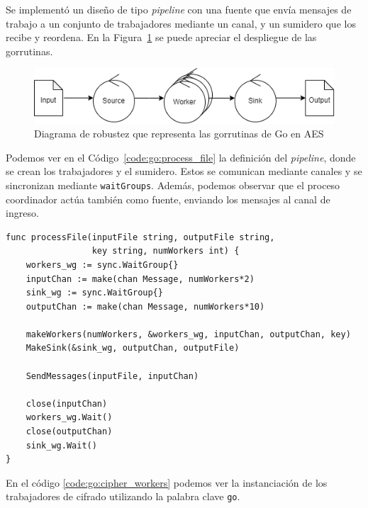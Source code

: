 \documentclass[11pt]{article}
\newcommand{\english}[1]{\textit{#1}}
\begin{document}
Se implementó un diseño de tipo \english{pipeline} con una fuente que envía mensajes de trabajo a un conjunto de trabajadores mediante un canal, y un sumidero que los recibe y reordena. En la Figura~\ref{fig:go:robustness} se puede apreciar el despliegue de las gorrutinas.

\begin{figure}[h]
    \centering
    \includegraphics[scale=0.7]{resources/aes/go_robustness.png}
    \caption{Diagrama de robustez que representa las gorrutinas de Go en AES}
    \label{fig:go:robustness}
\end{figure}

Podemos ver en el Código~\ref{code:go:process_file} la definición del \english{pipeline}, donde se crean los trabajadores y el sumidero. Estos se comunican mediante canales y se sincronizan mediante \lstinline{waitGroups}. Además, podemos observar que el proceso coordinador actúa también como fuente, enviando los mensajes al canal de ingreso.

\begin{listing}[h]
\begin{verbatim}
func processFile(inputFile string, outputFile string,
                 key string, numWorkers int) {
    workers_wg := sync.WaitGroup{}
    inputChan := make(chan Message, numWorkers*2)
    sink_wg := sync.WaitGroup{}
    outputChan := make(chan Message, numWorkers*10)

    makeWorkers(numWorkers, &workers_wg, inputChan, outputChan, key)
    MakeSink(&sink_wg, outputChan, outputFile)

    SendMessages(inputFile, inputChan)

    close(inputChan)
    workers_wg.Wait()
    close(outputChan)
    sink_wg.Wait()
}
\end{verbatim}
\caption{Definición de la función \lstinline{processFile} en Go, que crea los trabajadores y el sumidero (\english{sink}), y envía los bloques a los trabajadores}
\label{code:go:process_file}
\end{listing}

En el código \ref{code:go:cipher_workers} podemos ver la instanciación de los trabajadores de cifrado utilizando la palabra clave \lstinline{go}.
\end{document}
